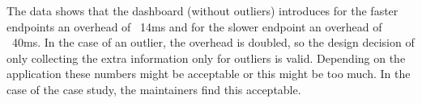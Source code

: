 	The data shows that the dashboard (without outliers) introduces for the faster endpoints an overhead of ~14ms and for the slower endpoint an overhead of ~40ms. 
	In the case of an outlier, the overhead is doubled, so the design decision of only collecting the extra information only for outliers is valid. 
	Depending on the application these numbers might be acceptable or this might be too much. In the case of the \zee case study, the maintainers find this acceptable. 



  